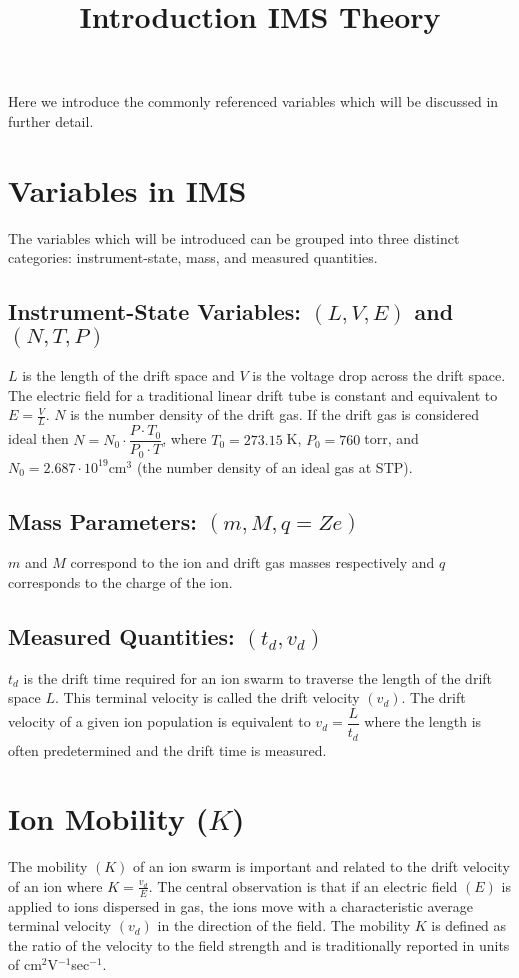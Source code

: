 \documentclass[10pt,a4paper,final]{article}
\title{Introduction IMS Theory}
\begin{document}
Here we introduce the commonly referenced variables which will be discussed in further detail.
\section{Variables in IMS}
The variables which will be introduced can be grouped into three distinct categories: instrument-state, mass, and measured quantities.
\subsection{Instrument-State Variables: $(L, V, E)$ and $(N, T, P)$}
$L$ is the length of the drift space and $V$ is the voltage drop across the drift space. The electric field for a traditional linear drift tube is constant and equivalent to $E=\frac{V}{L}$. $N$ is the number density of the drift gas. If the drift gas is considered ideal then $N=N_0\cdot \dfrac{P\cdot T_0}{P_0\cdot T}$, where $T_0=273.15\;$K, $P_0= 760\;$torr, and  $N_0=2.687\cdot10^{19} \text{cm}^3$ (the number density of an ideal gas at STP).
\subsection{Mass Parameters: $(m, M, q=Ze)$}
$m$ and $M$ correspond to the ion and drift gas masses respectively and $q$ corresponds to the charge of the ion.
\subsection{Measured Quantities: $(t_d, v_d)$}
$t_d$ is the drift time required for an ion swarm to traverse the length of the drift space $L$. This terminal velocity is called the drift velocity $(v_d)$. The drift velocity of a given ion population is equivalent to $v_d=\dfrac{L}{t_d}$ where the length is often predetermined and the drift time is measured.
\section{Ion Mobility ($K$)}
The mobility $(K)$ of an ion swarm is important and related to the drift velocity of an ion where $K=\frac{v_d}{E}$.
The central observation is that if an electric field $(E)$ is applied to ions dispersed in gas, the ions move with a characteristic average terminal velocity $(v_d)$ in the direction of the field. The mobility $K$ is defined as the ratio of the velocity to the field strength and is traditionally reported in units of cm$^2$V$^{-1}$sec$^{-1}$.
\end{document}

